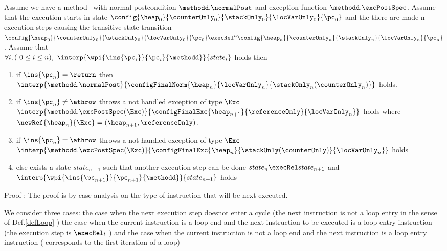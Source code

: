 \begin{lemma1}[Progress] \label{lemma1}
Assume we have a method \methodd \ with normal postcondition  $\methodd.\normalPost$ and exception function $\methodd.\excPostSpec$. 
Assume that the  execution starts in state $ \config{\heap_0}{\counterOnly_0}{\stackOnly_0}{\locVarOnly_0}{\pc_0}$
and the there are made  n execution steps causing the transitive state transition 
$ \config{\heap_0}{\counterOnly_0}{\stackOnly_0}{\locVarOnly_0}{\pc_0} \execRel^{n} \config{\heap_n}{\counterOnly_n}{\stackOnly_n}{\locVarOnly_n}{\pc_n} $.
Assume that \\
 $ \forall i, (\ 0 \leq i \leq n ) , \ \interp{\wpi{\ins{\pc_{i}} }{ \pc_{i} }{ \methodd } }{ state_i } $  
holds then
\begin{enumerate}
	\item if $\ins{\pc_n} = \return$  then $\interp{\methodd.\normalPost} {\configFinalNorm{\heap_n}{\locVarOnly_n} {\stackOnly_n( \counterOnly_n )}} $ holds.  
	
	\item if $\ins{\pc_n} \neq \athrow $ throws a not handled exception of type $\Exc$ \\
	$\interp{\methodd.\excPostSpec( \Exc)}{\configFinalExc{ \heap_{n+1}}{  \referenceOnly   }{\locVarOnly_n} } $ holds 
	where $\newRef{\heap_n}{\Exc} = (\heap_{n+1}, \referenceOnly )$.
	
	 \item if $\ins{\pc_n} = \athrow $ throws a not handled exception of type $\Exc$ \\
	$\interp{\methodd.\excPostSpec( \Exc)}{\configFinalExc{ \heap_{n}}{  \stackOnly (\counterOnly)   }{\locVarOnly_n} } $ holds 
	
	
	\item else exists a state $state_{n+1}$ such that another execution step can be done 
	 $state_n  \execRel state_{n+1}$ and  $\interp{ \wpi{\ins{\pc_{n+1}}}{\pc_{n+1} }{\methodd} } { state_{n+1} } $  holds
\end{enumerate}
\end{lemma1}


Proof :
The proof is by case analysis on the type of instruction that will be next executed. 

 We consider three cases: the case when the next execution step doesnot enter a cycle (the next instruction is not a loop entry in the sense of Def.\ref{defLoop} )
the case when the current instruction is a loop end and the next instruction to be executed is a loop entry instruction (the execution step is $\execRel_l$ )
and the case when the current instruction is not a loop end and the next instruction is a loop entry instruction ( corresponds to the first iteration of a loop) 

